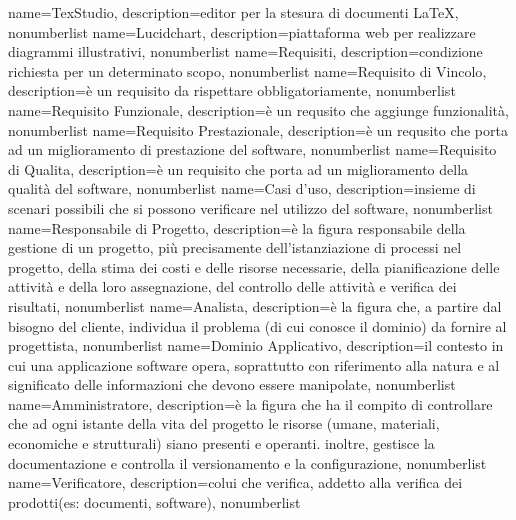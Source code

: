 {
	name={TexStudio},
	description={editor per la stesura di documenti \LaTeX},
	nonumberlist 
}
{
	name={Lucidchart},
	description={piattaforma web per realizzare diagrammi illustrativi},
	nonumberlist 
}
{
	name={Requisiti},
	description={condizione richiesta per un determinato scopo},
	nonumberlist 
}
{
	name={Requisito di Vincolo},
	description={è un requisito da rispettare obbligatoriamente},
	nonumberlist 
}
{
	name={Requisito Funzionale},
	description={è un requsito che aggiunge funzionalità},
	nonumberlist 
}
{
	name={Requisito Prestazionale},
	description={è un requsito che porta ad un miglioramento di prestazione del software},
	nonumberlist 
}
{
	name={Requisito di Qualita},
	description={è un requisito che porta ad un miglioramento della qualità del software},
	nonumberlist 
}
{
	name={Casi d'uso},
	description={insieme di scenari possibili che si possono verificare nel	utilizzo del software},
	nonumberlist 
}
{
	name={Responsabile di Progetto},
	description={è la figura responsabile della gestione di un progetto, più precisamente dell'istanziazione di processi nel progetto, della stima dei costi e delle risorse necessarie, della pianificazione delle attività e della loro assegnazione, del controllo delle attività e verifica dei risultati},
	nonumberlist 
}
{
	name={Analista},
	description={è la figura che, a partire dal bisogno del cliente, individua il problema (di cui conosce il dominio) da fornire al progettista},
	nonumberlist 
}
{
	name={Dominio Applicativo},
	description={il contesto in cui una applicazione software opera, soprattutto con riferimento alla natura e al significato delle informazioni che devono essere manipolate},
	nonumberlist 
}
{
	name={Amministratore},
	description={è la figura che ha il compito di controllare che ad ogni istante della vita del progetto le risorse (umane, materiali, economiche e strutturali) siano presenti e operanti. inoltre, gestisce la documentazione e controlla il versionamento e la configurazione},
	nonumberlist 
}
{
	name={Verificatore},
	description={colui che verifica, addetto alla verifica dei prodotti(es: documenti, software)},
	nonumberlist 
}
